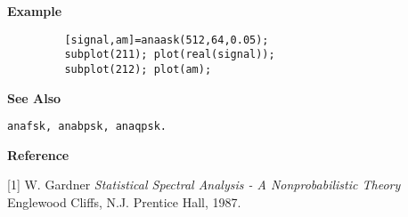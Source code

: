 {\bf \large \sf Example}
\begin{verbatim}
         [signal,am]=anaask(512,64,0.05); 
         subplot(211); plot(real(signal)); 
         subplot(212); plot(am);
\end{verbatim}
\vspace*{.5cm}


{\bf \large \sf See Also}\\
\hspace*{1.5cm}
\begin{minipage}[t]{13.5cm}
\begin{verbatim}
anafsk, anabpsk, anaqpsk.
\end{verbatim}
\end{minipage}
\vspace*{.5cm}


{\bf \large \sf Reference}\\
\hspace*{1.5cm}
\begin{minipage}[t]{13.5cm}
[1] W. Gardner {\it Statistical Spectral Analysis - A Nonprobabilistic
Theory} Englewood Cliffs, N.J. Prentice Hall, 1987.
\end{minipage}
